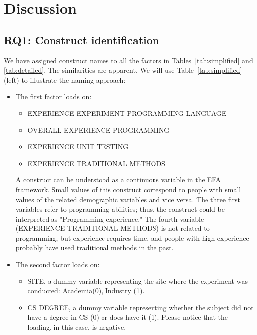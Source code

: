 \documentclass[10pt,conference]{IEEEtran}\usepackage[]{graphicx}\usepackage[table,xcdraw]{xcolor}
\begin{document}
\section{Discussion}

\subsection{RQ1: Construct identification}

We have assigned construct names to all the factors in Tables~\ref{tab:simplified} and \ref{tab:detailed}. The similarities are apparent. We will use Table~\ref{tab:simplified} (left) to illustrate the naming approach:
\begin{itemize}
    \item The first factor loads on:
    
    \begin{itemize}
        \item EXPERIENCE EXPERIMENT PROGRAMMING LANGUAGE
        \item OVERALL EXPERIENCE PROGRAMMING
        \item EXPERIENCE UNIT TESTING
        \item EXPERIENCE TRADITIONAL METHODS
    \end{itemize}
    
    A construct can be understood as a continuous variable in the EFA framework. Small values of this construct correspond to people with small values of the related demographic variables and vice versa. The three first variables refer to programming abilities; thus, the construct could be interpreted as "Programming experience." The fourth variable (EXPERIENCE TRADITIONAL METHODS) is not related to programming, but experience requires time, and people with high experience probably have used traditional methods in the past.
    
    \item The second factor loads on:
    
    \begin{itemize}
        \item SITE, a dummy variable representing the site where the experiment was conducted: Academia(0), Industry (1).
        
        \item CS DEGREE, a dummy variable representing whether the subject did not have a degree in CS (0) or does have it (1). Please notice that the loading, in this case, is negative.
        

\end{itemize}
\end{itemize}
\end{document}
